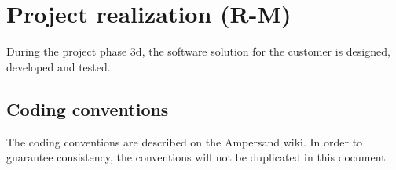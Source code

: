 \section{Project realization (R-M)}
\label{sec:project-realization}
%
During the project phase 3d, the software solution for the customer is designed, developed and tested.

\subsection{Coding conventions}
\label{subsec:coding-conventions}
%
The coding conventions are described on the Ampersand wiki\cite{ampersand-wiki}.
In order to guarantee consistency, the conventions will not be duplicated in this document.

